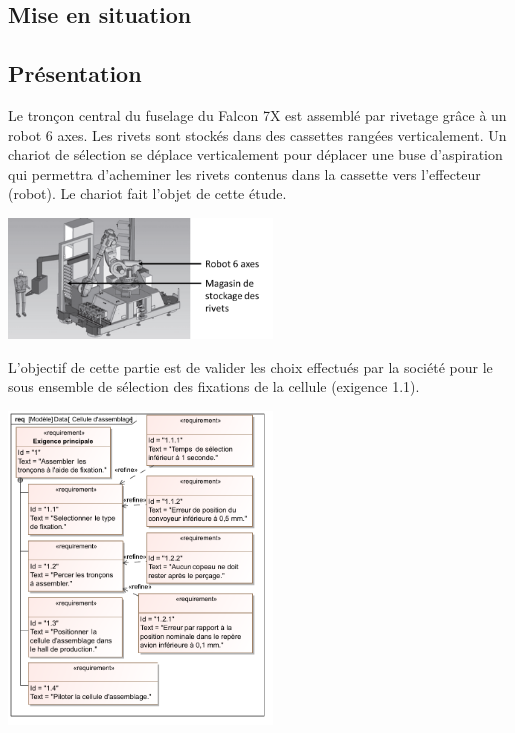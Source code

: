 \documentclass[10pt,fleqn]{article} %
\begin{document}

\vspace{5cm}
\pagestyle{fancy}
\thispagestyle{plain}

\setlength{\columnseprule}{0.4pt}
\begin{multicols}{2}
\section*{Mise en situation}
\ifprof
\else

\subsection*{Présentation}
Le tronçon central du fuselage du Falcon 7X est assemblé par rivetage grâce à un robot 6 axes. Les rivets sont stockés dans des cassettes rangées verticalement. Un chariot de sélection se déplace verticalement pour déplacer une buse d'aspiration qui permettra d'acheminer les rivets contenus dans la cassette vers l'effecteur (robot). Le chariot fait l'objet de cette étude.

\begin{center}
\includegraphics[width=7cm]{images/image5}
\end{center} 

 
L'objectif de cette partie est de valider les choix effectués par la société pour le sous ensemble de sélection des fixations de la cellule (exigence 1.1).

\vfill

\begin{center}
\includegraphics[width=7cm]{images/Exigences}
\end{center} 





\end{multicols}
\end{document}
